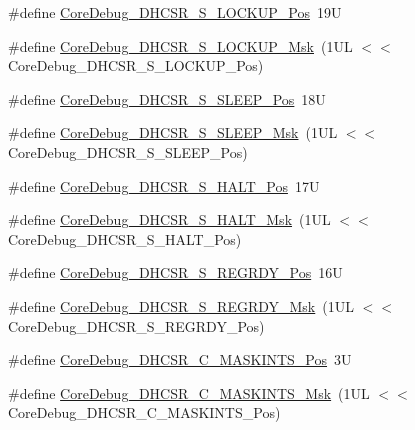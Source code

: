 \begin{DoxyCompactItemize}
\item 
\#define \mbox{\hyperlink{group___c_m_s_i_s___core_debug_ga2900dd56a988a4ed27ad664d5642807e}{Core\+Debug\+\_\+\+D\+H\+C\+S\+R\+\_\+\+S\+\_\+\+L\+O\+C\+K\+U\+P\+\_\+\+Pos}}~19U
\item 
\#define \mbox{\hyperlink{group___c_m_s_i_s___core_debug_ga7b67e4506d7f464ef5dafd6219739756}{Core\+Debug\+\_\+\+D\+H\+C\+S\+R\+\_\+\+S\+\_\+\+L\+O\+C\+K\+U\+P\+\_\+\+Msk}}~(1\+U\+L $<$$<$ Core\+Debug\+\_\+\+D\+H\+C\+S\+R\+\_\+\+S\+\_\+\+L\+O\+C\+K\+U\+P\+\_\+\+Pos)
\item 
\#define \mbox{\hyperlink{group___c_m_s_i_s___core_debug_ga349ccea33accc705595624c2d334fbcb}{Core\+Debug\+\_\+\+D\+H\+C\+S\+R\+\_\+\+S\+\_\+\+S\+L\+E\+E\+P\+\_\+\+Pos}}~18U
\item 
\#define \mbox{\hyperlink{group___c_m_s_i_s___core_debug_ga98d51538e645c2c1a422279cd85a0a25}{Core\+Debug\+\_\+\+D\+H\+C\+S\+R\+\_\+\+S\+\_\+\+S\+L\+E\+E\+P\+\_\+\+Msk}}~(1\+U\+L $<$$<$ Core\+Debug\+\_\+\+D\+H\+C\+S\+R\+\_\+\+S\+\_\+\+S\+L\+E\+E\+P\+\_\+\+Pos)
\item 
\#define \mbox{\hyperlink{group___c_m_s_i_s___core_debug_ga760a9a0d7f39951dc3f07d01f1f64772}{Core\+Debug\+\_\+\+D\+H\+C\+S\+R\+\_\+\+S\+\_\+\+H\+A\+L\+T\+\_\+\+Pos}}~17U
\item 
\#define \mbox{\hyperlink{group___c_m_s_i_s___core_debug_ga9f881ade3151a73bc5b02b73fe6473ca}{Core\+Debug\+\_\+\+D\+H\+C\+S\+R\+\_\+\+S\+\_\+\+H\+A\+L\+T\+\_\+\+Msk}}~(1\+U\+L $<$$<$ Core\+Debug\+\_\+\+D\+H\+C\+S\+R\+\_\+\+S\+\_\+\+H\+A\+L\+T\+\_\+\+Pos)
\item 
\#define \mbox{\hyperlink{group___c_m_s_i_s___core_debug_ga20a71871ca8768019c51168c70c3f41d}{Core\+Debug\+\_\+\+D\+H\+C\+S\+R\+\_\+\+S\+\_\+\+R\+E\+G\+R\+D\+Y\+\_\+\+Pos}}~16U
\item 
\#define \mbox{\hyperlink{group___c_m_s_i_s___core_debug_gac4cd6f3178de48f473d8903e8c847c07}{Core\+Debug\+\_\+\+D\+H\+C\+S\+R\+\_\+\+S\+\_\+\+R\+E\+G\+R\+D\+Y\+\_\+\+Msk}}~(1\+U\+L $<$$<$ Core\+Debug\+\_\+\+D\+H\+C\+S\+R\+\_\+\+S\+\_\+\+R\+E\+G\+R\+D\+Y\+\_\+\+Pos)
\item 
\#define \mbox{\hyperlink{group___c_m_s_i_s___core_debug_ga0d2907400eb948a4ea3886ca083ec8e3}{Core\+Debug\+\_\+\+D\+H\+C\+S\+R\+\_\+\+C\+\_\+\+M\+A\+S\+K\+I\+N\+T\+S\+\_\+\+Pos}}~3U
\item 
\#define \mbox{\hyperlink{group___c_m_s_i_s___core_debug_ga77fe1ef3c4a729c1c82fb62a94a51c31}{Core\+Debug\+\_\+\+D\+H\+C\+S\+R\+\_\+\+C\+\_\+\+M\+A\+S\+K\+I\+N\+T\+S\+\_\+\+Msk}}~(1\+U\+L $<$$<$ Core\+Debug\+\_\+\+D\+H\+C\+S\+R\+\_\+\+C\+\_\+\+M\+A\+S\+K\+I\+N\+T\+S\+\_\+\+Pos)
$$
\end{DoxyCompactItemize}

